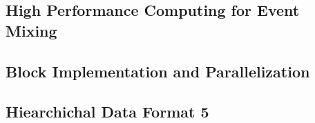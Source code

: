 \documentclass{ucbthesis}
\begin{document}








\begin{appendices}
	\chapter{High Performance Computing for Event Mixing}
		\section{Block Implementation and Parallelization}
		\section{Hiearchichal Data Format 5}		
\end{appendices}

\printbibliography

%
%
\end{document}
